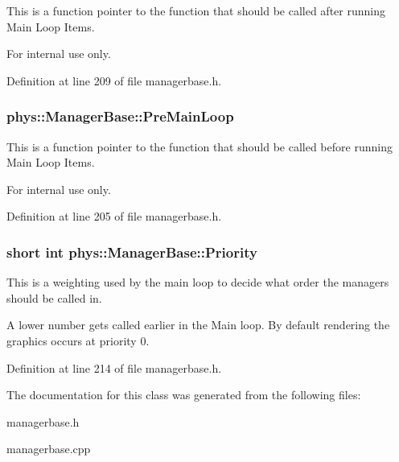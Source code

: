 This is a function pointer to the function that should be called after running Main Loop Items. 

\begin{DoxyInternal}{For internal use only.}
\end{DoxyInternal}


Definition at line 209 of file managerbase.h.

\hypertarget{classphys_1_1ManagerBase_a93eb2f1a30d913a4e99180b0965eb5db}{
\subsubsection[{PreMainLoop}]{ {\bf phys::ManagerBase::PreMainLoop}}}
\label{d2/de3/classphys_1_1ManagerBase_a93eb2f1a30d913a4e99180b0965eb5db}


This is a function pointer to the function that should be called before running Main Loop Items. 

\begin{DoxyInternal}{For internal use only.}
\end{DoxyInternal}


Definition at line 205 of file managerbase.h.

\hypertarget{classphys_1_1ManagerBase_a28e2690fbcf644a7780a53b81821d8ef}{
\subsubsection[{Priority}]{\setlength{\rightskip}{0pt plus 5cm}short int {\bf phys::ManagerBase::Priority}}}
\label{d2/de3/classphys_1_1ManagerBase_a28e2690fbcf644a7780a53b81821d8ef}


This is a weighting used by the main loop to decide what order the managers should be called in. 

A lower number gets called earlier in the Main loop. By default rendering the graphics occurs at priority 0. 

Definition at line 214 of file managerbase.h.



The documentation for this class was generated from the following files:\begin{DoxyCompactItemize}
\item 
managerbase.h\item 
managerbase.cpp\end{DoxyCompactItemize}
